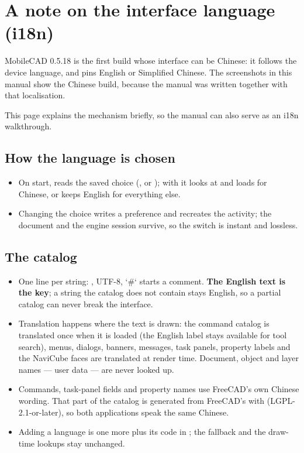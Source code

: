 \chapter*{A note on the interface language (i18n)}

MobileCAD 0.5.18 is the first build whose interface can be Chinese: it follows the device language, and
 pins English or Simplified Chinese. The screenshots in this manual show the
Chinese build, because the manual was written together with that localisation.

This page explains the mechanism briefly, so the manual can also serve as an i18n walkthrough.

\section*{How the language is chosen}
\begin{itemize}
  \item On start,  reads the saved choice (,  or ); with
         it looks at  and loads  for
        Chinese, or keeps English for everything else.
  \item Changing the choice writes a preference and recreates the activity; the document and the engine session
        survive, so the switch is instant and lossless.
\end{itemize}

\section*{The catalog}
\begin{itemize}
  \item One line per string: , UTF-8, `\#` starts a comment. \textbf{The English text
        is the key}; a string the catalog does not contain stays English, so a partial catalog can never break the
        interface.
  \item Translation happens where the text is drawn: the command catalog is translated once when it is loaded
        (the English label stays available for tool search), menus, dialogs, banners, messages, task panels,
        property labels and the NaviCube faces are translated at render time. Document, object and layer names —
        user data — are never looked up.
  \item Commands, task-panel fields and property names use FreeCAD's own Chinese wording. That part of the catalog
        is generated from FreeCAD's  with
         (LGPL-2.1-or-later), so both applications
        speak the same Chinese.
  \item Adding a language is one more  plus its code in ; the
        fallback and the draw-time lookups stay unchanged.
\end{itemize}

